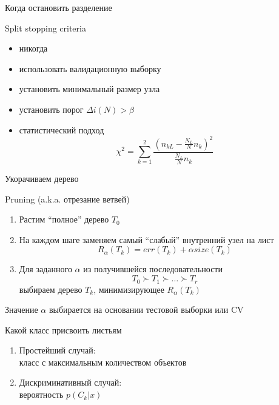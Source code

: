 \documentclass[aspectratio=169]{beamer}
\begin{document}
\begin{frame}{Когда остановить разделение}

Split stopping criteria
\begin{itemize}
\item никогда
\item использовать валидационную выборку
\item установить минимальный размер узла
\item установить порог $\Delta i(N) > \beta$
\item статистический подход
\[
\chi^2 = \sum_{k=1}^2 \frac{(n_{kL} - \frac{N_L}{N} n_{k})^2}{\frac{N_L}{N} n_{k}}
\]
\end{itemize}

\end{frame}

\begin{frame}{Укорачиваем дерево}

Pruning (a.k.a. отрезание ветвей)
\begin{enumerate}
\item Растим ``полное'' дерево $T_0$
\item На каждом шаге заменяем самый ``слабый'' внутренний узел на лист
\[
R_{\alpha}(T_k) = err(T_k) + \alpha size(T_k)
\]
\item Для заданного $\alpha $ из получившейся последовательности 
\[
T_0 \succ T_1 \succ \ldots \succ T_r
\]
выбираем дерево $T_k$, минимизирующее $R_{\alpha}(T_k)$
\end{enumerate}
Значение $\alpha$  выбирается на основании тестовой выборки или CV

\end{frame}

\begin{frame}{Какой класс присвоить листьям}

\begin{enumerate}
\item Простейший случай: \\ класс с максимальным количеством объектов
\item Дискриминативный случай: \\ вероятность $p(C_k | x)$
\end{enumerate}

\end{frame}
\end{document}
